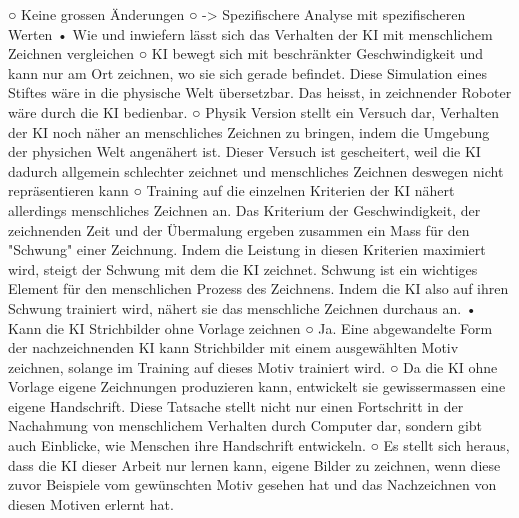 		○ Keine grossen Änderungen
		○ -> Spezifischere Analyse mit spezifischeren Werten
	• Wie und inwiefern lässt sich das Verhalten der KI mit menschlichem Zeichnen vergleichen
		○ KI bewegt sich mit beschränkter Geschwindigkeit und kann nur am Ort zeichnen, wo sie sich gerade befindet. Diese Simulation eines Stiftes wäre in die physische Welt übersetzbar. Das heisst, in zeichnender Roboter wäre durch die KI bedienbar.
		○ Physik Version stellt ein Versuch dar, Verhalten der KI noch näher an menschliches Zeichnen zu bringen, indem die Umgebung der physichen Welt angenähert ist. Dieser Versuch ist gescheitert, weil die KI dadurch allgemein schlechter zeichnet und menschliches Zeichnen deswegen nicht repräsentieren kann
		○ Training auf die einzelnen Kriterien der KI nähert allerdings menschliches Zeichnen an. Das Kriterium der Geschwindigkeit, der zeichnenden Zeit und der Übermalung ergeben zusammen ein Mass für den "Schwung" einer Zeichnung. Indem die Leistung in diesen Kriterien maximiert wird, steigt der Schwung mit dem die KI zeichnet. Schwung ist ein wichtiges Element für den menschlichen Prozess des Zeichnens. Indem die KI also auf ihren Schwung trainiert wird, nähert sie das menschliche Zeichnen durchaus an.
	• Kann die KI Strichbilder ohne Vorlage zeichnen
		○ Ja. Eine abgewandelte Form der nachzeichnenden KI kann Strichbilder mit einem ausgewählten Motiv zeichnen, solange im Training auf dieses Motiv trainiert wird.
		○ Da die KI ohne Vorlage eigene Zeichnungen produzieren kann, entwickelt sie gewissermassen eine eigene Handschrift. Diese Tatsache stellt nicht nur einen Fortschritt in der Nachahmung von menschlichem Verhalten durch Computer dar, sondern gibt auch Einblicke, wie Menschen ihre Handschrift entwickeln. 
		○ Es stellt sich heraus, dass die KI dieser Arbeit nur lernen kann, eigene Bilder zu zeichnen, wenn diese zuvor Beispiele vom gewünschten Motiv gesehen hat und das Nachzeichnen von diesen Motiven erlernt hat.












